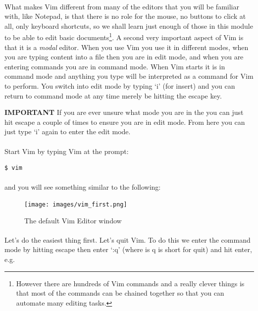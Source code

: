 \documentclass[12pt, a4paper, oneside]{book}
\begin{document}
\paragraph{} What makes Vim different from many of the editors that you will be familiar with, like Notepad, is that there is no role for the mouse, no buttons to click at all, only keyboard shortcuts, so we shall learn just enough of those in this module to be able to edit basic documents\footnote{However there are hundreds of Vim commands and a really clever things is that most of the commands can be chained together so that you can automate many editing tasks.}. A second very important aspect of Vim is that it is a \emph{modal} editor. When you use Vim you use it in different modes, when you are typing content into a file then you are in edit mode, and when you are entering commands you are in command mode. When Vim starts it is in command mode and anything you type will be interpreted as a command for Vim to perform. You switch into edit mode by typing `i' (for insert) and you can return to command mode at any time merely be hitting the escape key.

\begin{framed}
\textbf{IMPORTANT} If you are ever unsure what mode you are in the you can just hit escape a couple of times to ensure you are in edit mode. From here you can just type `i' again to enter the edit mode.
\end{framed}

\paragraph{} Start Vim by typing Vim at the prompt:
\begin{lstlisting}[style=DOS]
    $ vim
\end{lstlisting}
\paragraph{} and you will see something similar to the following:

\begin{figure}[H]
\centering
\texttt{[image: images/vim\_first.png]}
\caption{The default Vim Editor window}
\label{fig:vim-first}
\end{figure}

\paragraph{} Let's do the easiest thing first. Let's quit Vim. To do this we enter the command mode by hitting escape then enter `:q' (where is q is short for quit) and hit enter, e.g.
\end{document}
